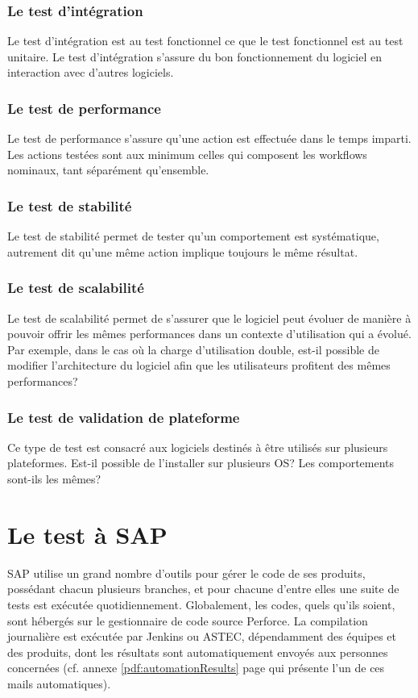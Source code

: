 \subsubsection{Le test d'intégration}
Le test d'intégration est au test fonctionnel ce que le test fonctionnel est au test unitaire. Le test d'intégration s'assure du bon fonctionnement du logiciel en interaction avec d'autres logiciels.

\subsubsection{Le test de performance}
Le test de performance s'assure qu'une action est effectuée dans le temps imparti. Les actions testées sont aux minimum celles qui composent les workflows nominaux, tant séparément qu'ensemble.

\subsubsection{Le test de stabilité}
Le test de stabilité permet de tester qu'un comportement est systématique, autrement dit qu'une même action implique toujours le même résultat.

\subsubsection{Le test de scalabilité}
Le test de scalabilité permet de s'assurer que le logiciel peut évoluer de manière à pouvoir offrir les mêmes performances dans un contexte d'utilisation qui a évolué. Par exemple, dans le cas où la charge d'utilisation double, est-il possible de modifier l'architecture du logiciel afin que les utilisateurs profitent des mêmes performances?


\subsubsection{Le test de validation de plateforme}
Ce type de test est consacré aux logiciels destinés à être utilisés sur plusieurs plateformes. Est-il possible de l'installer sur plusieurs OS? Les comportements sont-ils les mêmes?

\section{Le test \`{a} SAP}


SAP utilise un grand nombre d'outils pour g\'{e}rer le code de ses produits, poss\'{e}dant chacun plusieurs branches, et pour chacune d'entre elles une suite de tests est ex\'{e}cut\'{e}e quotidiennement. Globalement, les codes, quels qu'ils soient, sont h\'{e}berg\'{e}s sur le gestionnaire de code source Perforce. La compilation journali\`{e}re est ex\'{e}cut\'{e}e par Jenkins ou ASTEC, d\'{e}pendamment des \'{e}quipes et des produits, dont les r\'{e}sultats sont automatiquement envoy\'{e}s aux personnes concern\'{e}es (cf. annexe \ref{pdf:automationResults} page \pageref{pdf:automationResults} qui pr\'{e}sente l'un de ces mails automatiques).\\



